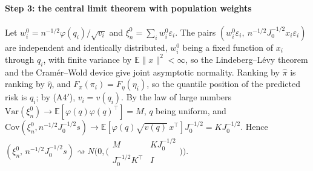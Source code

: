 \documentclass[11pt]{article}
\begin{document}
\paragraph{Step 3: the central limit theorem with population weights} Let
$w_i^0=n^{-1/2}\varphi(q_i)/\sqrt{v_i}$ and $\xi_n^0=\sum_iw_i^0\varepsilon_i$. The pairs
$(w_i^0\varepsilon_i,\ n^{-1/2}J_0^{-1/2}x_i\varepsilon_i)$ are independent and identically
distributed, $w_i^0$ being a fixed function of $x_i$ through $q_i$, with finite variance by
$\mathbb{E}\|x\|^2<\infty$, so the Lindeberg--L\'evy theorem and the Cram\'er--Wold device give joint
asymptotic normality. Ranking by $\hat\pi$ is ranking by $\hat\eta$, and $F_\pi(\pi_i)=F_\eta(\eta_i)$,
so the quantile position of the predicted risk is $q_i$; by (A4$'$), $v_i=v(q_i)$. By the law of
large numbers $\mathrm{Var}(\xi_n^0)\to\mathbb{E}[\varphi(q)\varphi(q)^\top]=M$, $q$ being uniform,
and $\mathrm{Cov}(\xi_n^0,n^{-1/2}J_0^{-1/2}s)\to\mathbb{E}[\varphi(q)\sqrt{v(q)}\,x^\top]J_0^{-1/2}
=KJ_0^{-1/2}$. Hence $(\xi_n^0,\,n^{-1/2}J_0^{-1/2}s)\rightsquigarrow
N\big(0,\big(\begin{smallmatrix}M&KJ_0^{-1/2}\\ J_0^{-1/2}K^\top&I\end{smallmatrix}\big)\big)$.
\end{document}
